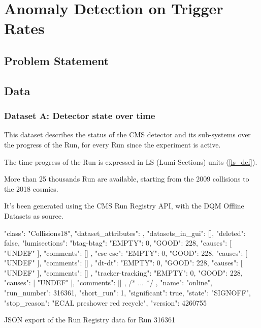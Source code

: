 \chapter{Anomaly Detection on Trigger Rates}
\label{dataset}
\section{Problem Statement}

\section{Data}

\subsection{Dataset A: Detector state over time}

This dataset describes the status of the CMS detector and its sub-systems over the progress of the Run, for every Run since the experiment is active.

The time progress of the Run is expressed in LS (Lumi Sections) units (\ref{ls_def}).

More than 25 thousands Run are available, starting from the 2009 collisions to the 2018 cosmics.

It's been generated using the CMS Run Registry API, with the DQM Offline Datasets as source.

\begin{listing}[H]
\begin{jsoncode}
  {
    "class": "Collisions18",
    "dataset_attributes": {},
    "datasets_in_gui": [],
    "deleted": false,
    "lumisections": {
      "btag-btag": {
        "EMPTY": 0,
        "GOOD": 228,
        "causes": [
          "UNDEF"
        ],
        "comments": []
      },
      "csc-csc": {
        "EMPTY": 0,
        "GOOD": 228,
        "causes": [
          "UNDEF"
        ],
        "comments": []
      },
      "dt-dt": {
        "EMPTY": 0,
        "GOOD": 228,
        "causes": [
          "UNDEF"
        ],
        "comments": []
      },
      "tracker-tracking": {
        "EMPTY": 0,
        "GOOD": 228,
        "causes": [
          "UNDEF"
        ],
        "comments": []
      },
      /* ... */
    },
    "name": "online",
    "run_number": 316361,
    "short_run": 1,
    "significant": true,
    "state": "SIGNOFF",
    "stop_reason": "ECAL preshower red recycle",
    "version": 4260755
  }
\end{jsoncode}
\caption{JSON export of the Run Registry data for Run 316361}
\end{listing}

